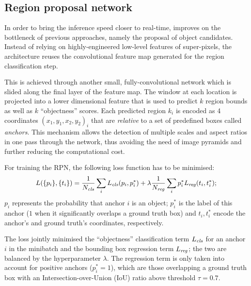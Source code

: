 	\subsection{Region proposal network}\label{sec:frcnn_rpn}
		In order to bring the inference speed closer to real-time, \FRCNN{} improves on the bottleneck of previous approaches, namely the proposal of object candidates. Instead of relying on highly-engineered low-level features of super-pixels, the architecture reuses the convolutional feature map generated for the region classification step.

		This is achieved through another small, fully-convolutional network which is slided along the final layer of the feature map. The window at each location is projected into a lower dimensional feature that is used to predict \(k\) region bounds as well as \(k\) ``objectness'' scores. Each predicted region \(k_i\) is encoded as 4  coordinates \((x_1, y_1, x_2, y_2)_i\) that are \emph{relative} to a set of predefined boxes called \emph{anchors}. This mechanism allows the detection of multiple scales and aspect ratios in one pass through the network, thus avoiding the need of image pyramids and further reducing the computational cost.

		For training the RPN, the following loss function has to be minimised:
		\begin{equation}\label{eq:rpn_loss}
		L(\{p_i\}, \{t_i\}) = \frac{1}{N_{\mathit{cls}}}\sum_i L_{\mathit{cls}}(p_i, p^{*}_i) + \lambda\frac{1}{N_{\mathit{reg}}}\sum_i  p^{*}_i L_{\mathit{reg}}(t_i, t^{*}_i);
		\end{equation}
		\(p_i\) represents the probability that anchor \(i\) is an object; \(p^{*}_i\) is the label of this anchor (\(1\) when it significantly overlaps a ground truth box) and \(t_i, t^{*}_i\) encode the anchor's and ground truth's coordinates, respectively.

		The loss jointly minimised  the ``objectness'' classification term \(L_{\mathit{cls}}\) for an anchor \(i\) in the minibatch and the bounding box regression term \(L_{\mathit{reg}}\); the two are balanced by the hyperparameter \(\lambda\). The regression term is only taken into account for positive anchors (\(p^{*}_i = 1\)), which are those overlapping a ground truth box with an Intersection-over-Union (IoU) ratio above threshold \(\tau = 0.7\).


